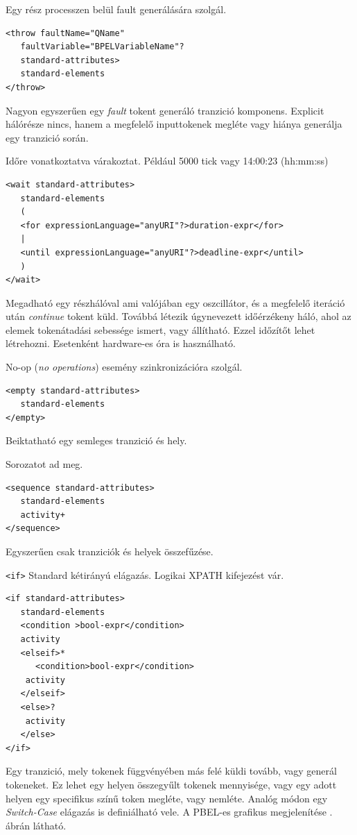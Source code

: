 Egy rész processzen belül fault generálására szolgál. 
\begin{verbatim}
<throw faultName="QName"
   faultVariable="BPELVariableName"?
   standard-attributes>
   standard-elements
</throw>
\end{verbatim}
Nagyon egyszerűen egy \textit{fault} tokent generáló tranzició komponens. Explicit hálórésze nincs, hanem a megfelelő inputtokenek megléte vagy hiánya generálja egy tranzició során. 

Időre vonatkoztatva várakoztat. Például 5000 tick vagy 14:00:23 (hh:mm:ss)
\begin{verbatim} 
<wait standard-attributes>
   standard-elements
   (
   <for expressionLanguage="anyURI"?>duration-expr</for>
   |
   <until expressionLanguage="anyURI"?>deadline-expr</until>
   )
</wait>
\end{verbatim}
Megadható egy részhálóval ami valójában egy oszcillátor, és a megfelelő iteráció után \emph{continue} tokent küld. Továbbá létezik úgynevezett időérzékeny háló, ahol az elemek tokenátadási sebessége ismert, vagy állítható. Ezzel időzítőt lehet létrehozni. Esetenként hardware-es óra is használható.

No-op (\textit{no operations}) esemény szinkronizációra szolgál.
\begin{verbatim}
<empty standard-attributes>
   standard-elements
</empty>
\end{verbatim}
Beiktatható egy semleges tranzició és hely.

Sorozatot ad meg.
\begin{verbatim}
<sequence standard-attributes>
   standard-elements
   activity+
</sequence>
\end{verbatim}
Egyszerűen csak tranziciók és helyek összefűzése. 


\texttt{<if>} Standard kétirányú elágazás. Logikai XPATH kifejezést vár. 
\begin{verbatim}
<if standard-attributes>
   standard-elements
   <condition >bool-expr</condition>
   activity
   <elseif>*
      <condition>bool-expr</condition>
  	activity
   </elseif>
   <else>?
  	activity
   </else>
</if>
\end{verbatim}
Egy tranzició, mely tokenek függvényében más felé küldi tovább, vagy generál tokeneket. Ez lehet egy helyen összegyűlt tokenek mennyisége, vagy egy adott helyen egy specifikus színű token megléte, vagy nemléte. Analóg módon egy \textit{Switch-Case} elágazás is definiálható vele.
A PBEL-es grafikus megjelenítése . ábrán látható.


